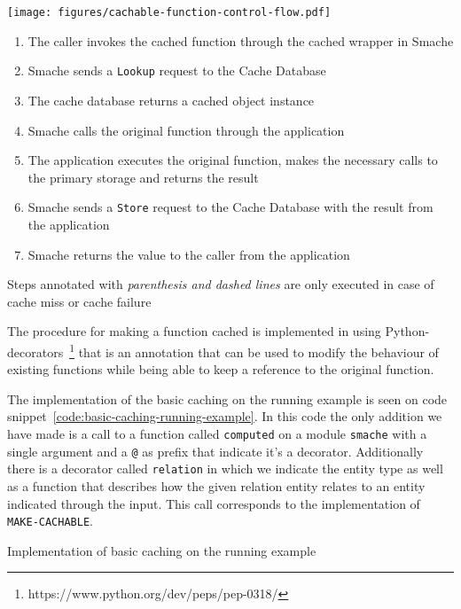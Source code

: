 \begin{figure*}[ht!]
  \begin{center}
    \texttt{[image: figures/cachable-function-control-flow.pdf]}
  \end{center}
  \begin{enumerate}
    \item The caller invokes the cached function through the cached wrapper in Smache
    \item Smache sends a \verb$Lookup$ request to the Cache Database
    \item The cache database returns a cached object instance
    \item[(4)] Smache calls the original function through the application
    \item[(5)] The application executes the original function, makes the necessary calls to the primary storage and returns the result
    \item[(6)] Smache sends a \verb$Store$ request to the Cache Database with the result from the application
    \item Smache returns the value to the caller from the application
  \end{enumerate}
  \footnotesize{Steps annotated with \emph{parenthesis and dashed lines} are only executed in case of cache miss or cache failure}
  \caption{The control flow during a call to a function cached through Smache}
  \label{fig:cachable-function-control-flow}
\end{figure*}

The procedure for making a function cached is implemented in using Python-decorators~\footnote{https://www.python.org/dev/peps/pep-0318/} that is an annotation that can be used to modify the behaviour of existing functions while being able to keep a reference to the original function.

The implementation of the basic caching on the running example is seen on code snippet~\ref{code:basic-caching-running-example}. In this code the only addition we have made is a call to a function called \verb$computed$ on a module \verb$smache$ with a single argument and a \verb$@$ as prefix that indicate it's a decorator. Additionally there is a decorator called \verb$relation$ in which we indicate the entity type as well as a function that describes how the given relation entity relates to an entity indicated through the input. This call corresponds to the implementation of \verb$MAKE-CACHABLE$.

\begin{code}{Implementation of basic caching on the running example}
  
  \label{code:basic-caching-running-example}
\end{code}

